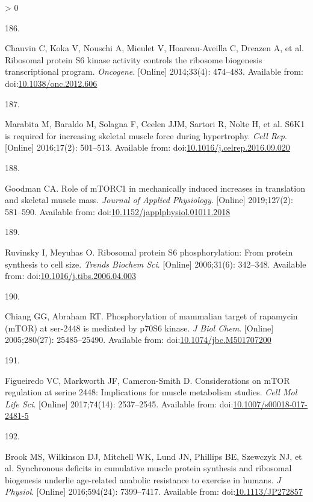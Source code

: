 \documentclass[twoside,10pt]{gihclass} %
\newlength{\cslhangindent}
\newlength{\csllabelwidth}
\newenvironment{CSLReferences}[3] %
 {%
  \setlength{\parindent}{0pt}
  \ifodd #1 \everypar{\setlength{\hangindent}{\cslhangindent}}\ignorespaces\fi
  \ifnum #2 > 0
  \setlength{\parskip}{#2\baselineskip}
  \fi
 }%
 {}
\newcommand{\CSLLeftMargin}[1]{\parbox[t]{\maxof{\widthof{#1}}{\csllabelwidth}}{#1}}
\newcommand{\CSLRightInline}[1]{\parbox[t]{\linewidth}{#1}}
\begin{document}
\begin{CSLReferences}{0}{0}
\leavevmode\hypertarget{ref-RN2321}{}%
\CSLLeftMargin{186. }
\CSLRightInline{Chauvin C, Koka V, Nouschi A, Mieulet V, Hoareau-Aveilla C, Dreazen A, et al. Ribosomal protein S6 kinase activity controls the ribosome biogenesis transcriptional program. \emph{Oncogene}. {[}Online{]} 2014;33(4): 474--483. Available from: doi:\href{https://doi.org/10.1038/onc.2012.606}{10.1038/onc.2012.606}}

\leavevmode\hypertarget{ref-RN2849}{}%
\CSLLeftMargin{187. }
\CSLRightInline{Marabita M, Baraldo M, Solagna F, Ceelen JJM, Sartori R, Nolte H, et al. S6K1 is required for increasing skeletal muscle force during hypertrophy. \emph{Cell Rep}. {[}Online{]} 2016;17(2): 501--513. Available from: doi:\href{https://doi.org/10.1016/j.celrep.2016.09.020}{10.1016/j.celrep.2016.09.020}}

\leavevmode\hypertarget{ref-RN2320}{}%
\CSLLeftMargin{188. }
\CSLRightInline{Goodman CA. Role of mTORC1 in mechanically induced increases in translation and skeletal muscle mass. \emph{Journal of Applied Physiology}. {[}Online{]} 2019;127(2): 581--590. Available from: doi:\href{https://doi.org/10.1152/japplphysiol.01011.2018}{10.1152/japplphysiol.01011.2018}}

\leavevmode\hypertarget{ref-RN2824}{}%
\CSLLeftMargin{189. }
\CSLRightInline{Ruvinsky I, Meyuhas O. Ribosomal protein S6 phosphorylation: From protein synthesis to cell size. \emph{Trends Biochem Sci}. {[}Online{]} 2006;31(6): 342--348. Available from: doi:\href{https://doi.org/10.1016/j.tibs.2006.04.003}{10.1016/j.tibs.2006.04.003}}

\leavevmode\hypertarget{ref-RN1902}{}%
\CSLLeftMargin{190. }
\CSLRightInline{Chiang GG, Abraham RT. Phosphorylation of mammalian target of rapamycin (mTOR) at ser-2448 is mediated by p70S6 kinase. \emph{J Biol Chem}. {[}Online{]} 2005;280(27): 25485--25490. Available from: doi:\href{https://doi.org/10.1074/jbc.M501707200}{10.1074/jbc.M501707200}}

\leavevmode\hypertarget{ref-RN1949}{}%
\CSLLeftMargin{191. }
\CSLRightInline{Figueiredo VC, Markworth JF, Cameron-Smith D. Considerations on mTOR regulation at serine 2448: Implications for muscle metabolism studies. \emph{Cell Mol Life Sci}. {[}Online{]} 2017;74(14): 2537--2545. Available from: doi:\href{https://doi.org/10.1007/s00018-017-2481-5}{10.1007/s00018-017-2481-5}}

\leavevmode\hypertarget{ref-RN1809}{}%
\CSLLeftMargin{192. }
\CSLRightInline{Brook MS, Wilkinson DJ, Mitchell WK, Lund JN, Phillips BE, Szewczyk NJ, et al. Synchronous deficits in cumulative muscle protein synthesis and ribosomal biogenesis underlie age-related anabolic resistance to exercise in humans. \emph{J Physiol}. {[}Online{]} 2016;594(24): 7399--7417. Available from: doi:\href{https://doi.org/10.1113/JP272857}{10.1113/JP272857}}


\end{CSLReferences}
\end{document}
